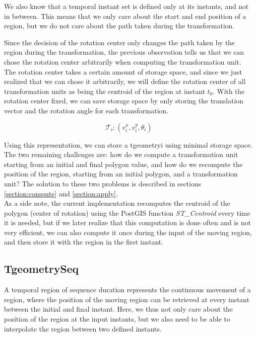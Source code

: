We also know that a temporal instant set is defined only at its instants, and not in between. This means that we only care about the start and end position of a region, but we do not care about the path taken during the transformation. 

Since the decision of the rotation center only changes the path taken by the region during the transformation, the previous observation tells us that we can chose the rotation center arbitrarily when computing the transformation unit. \\

The rotation center takes a certain amount of storage space, and since we just realized that we can chose it arbitrarily, we will define the rotation center of all transformation units as being the centroid of the region at instant $t_0$. With the rotation center fixed, we can save storage space by only storing the translation vector and the rotation angle for each transformation. 

\[
    \mathcal{T}_i: (v_i^x, v_i^y, \theta_i)
\]

Using this representation, we can store a tgeometryi using minimal storage space. The two remaining challenges are: how do we compute a transformation unit starting from an initial and final polygon value, and how do we recompute the position of the region, starting from an initial polygon, and a transformation unit? The solution to these two problems is described in sections \ref{section:compute} and \ref{section:apply}. \\

As a side note, the current implementation recomputes the centroid of the polygon (center of rotation) using the PostGIS function \textit{ST\_Centroid} every time it is needed, but if we later realize that this computation is done often and is not very efficient, we can also compute it once during the input of the moving region, and then store it with the region in the first instant.

\subsection{TgeometrySeq}
\label{section:internal_repr_seq}

A temporal region of sequence duration represents the continuous movement of a region, where the position of the moving region can be retrieved at every instant between the initial and final instant. Here, we thus not only care about the position of the region at the input instants, but we also need to be able to interpolate the region between two defined instants.

